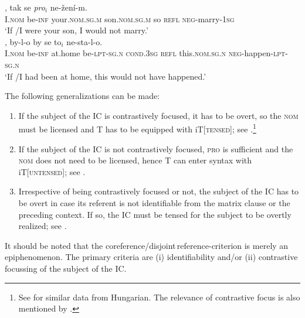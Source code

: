 \documentclass[output=paper,colorlinks,citecolor=brown,
modfonts,newtxmath
]{langscibook}
\begin{document}
\begin{itemize}
\ea\label{ex:son}
\ea\label{ex:son-a}
, tak se \textit{pro}$_i$ ne-žení-m.\\
	{} I.\textsc{nom} be-\textsc{inf} your.\textsc{nom.sg.m} son.\textsc{nom.sg.m} so \textsc{refl} {} \textsc{neg}-marry-\textsc{1sg} \\ 
\glt `If /I were your son, I would not marry.'\\\xspace\hfill \citep[Czech;][12]{Milotova2012}
\ex\label{ex:son-b}
, by-l-o by se to$_i$ ne-sta-l-o.\\
	{} I.\textsc{nom} be-\textsc{inf} {at.home} be-\textsc{lpt-sg.n} \textsc{cond.3sg} \textsc{refl} this.\textsc{nom.sg.n} \textsc{neg}-happen-\textsc{lpt-sg.n}\\
\glt `If /I had been at home, this would not have happened.'
\z
\z

\end{itemize}

\noindent The following generalizations can be made:

\begin{enumerate}

\item If the subject of the IC is contrastively focused, it has to be overt, so the \textsc{nom} must be licensed and T has to be equipped with iT[\textsc{tensed}]; see .\footnote{See \citet{Szabolcsi2009} for similar data from Hungarian. The relevance of contrastive focus is also mentioned by \citet[513]{McFaddenSundaresan2018}.}

\item If the subject of the IC is not contrastively focused, \textsc{pro} is sufficient and the \textsc{nom} does not need to be licensed, hence T can enter syntax with iT[\textsc{untensed}]; see . 

\item Irrespective of being contrastively focused or not, the subject of the IC has to be overt in case its referent is not identifiable from the matrix clause or the preceding context. If so, the IC must be tensed for the subject to be overtly realized; see .

\end{enumerate}

\noindent It should be noted that the coreference/disjoint\,reference-criterion is merely an epiphenomenon. The primary criteria are (i) identifiability and/or (ii) contrastive focussing of the subject of the IC.
\end{document}
